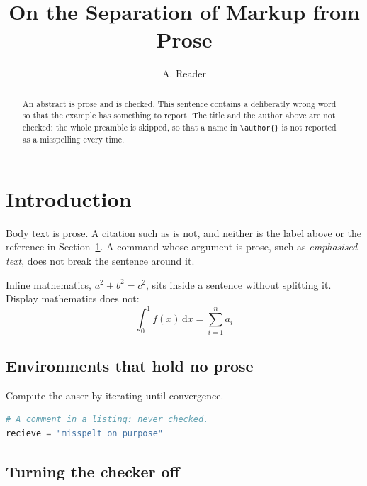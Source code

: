 \documentclass[11pt]{article}
\title{On the Separation of Markup from Prose}
\author{A. Reader}
\begin{document}
\maketitle

\begin{abstract}
  An abstract is prose and is checked. This sentence contains a deliberatly
  wrong word so that the example has something to report. The title and the
  author above are not checked: the whole preamble is skipped, so that a name
  in \verb|\author{}| is not reported as a misspelling every time.
\end{abstract}

\section{Introduction}
\label{sec:intro}

Body text is prose. A citation such as \cite{knuth1984} is not, and neither is
the label above or the reference in Section~\ref{sec:intro}. A command whose
argument is prose, such as \emph{emphasised text}, does not break the sentence
around it.

Inline mathematics, $a^2 + b^2 = c^2$, sits inside a sentence without splitting
it. Display mathematics does not:
\begin{equation}
  \int_0^1 f(x)\,\mathrm{d}x = \sum_{i=1}^{n} a_i
  \label{eq:sum}
\end{equation}

\subsection{Environments that hold no prose}

\begin{algorithm}
  Compute the anser by iterating until convergence.
\end{algorithm}

\begin{lstlisting}[language=Python]
# A comment in a listing: never checked.
recieve = "misspelt on purpose"
\end{lstlisting}

\subsection{Turning the checker off}
\end{document}
